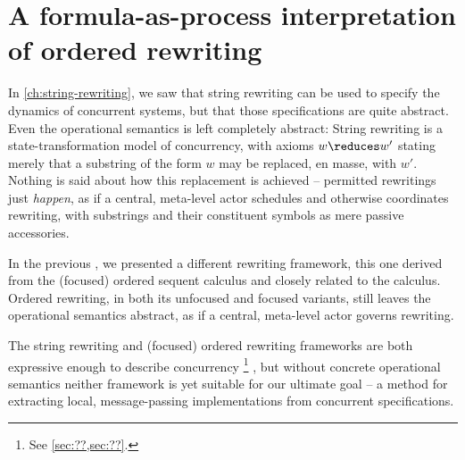 \chapter{A formula-as-process interpretation of ordered rewriting}\label{ch:formula-as-process}



In \cref{ch:string-rewriting}, we saw that string rewriting can be used to specify the dynamics of concurrent systems, but that those specifications are quite abstract.
Even the operational semantics is left completely abstract:
String rewriting is a state-transformation model of concurrency, with axioms $w \reduces w'$
stating merely that a substring of the form $w$ may be replaced, en masse, with $w'$.
Nothing is said about how this replacement is achieved -- permitted rewritings just \emph{happen}, as if a central, meta-level actor schedules and otherwise coordinates rewriting, with substrings and their constituent symbols as mere passive accessories.

In the previous , we presented a different rewriting framework, this one derived from the (focused) ordered sequent calculus and closely related to the \citeauthor{Lambek:AMM58} calculus\autocite{Lambek:AMM58}.
Ordered rewriting, in both its unfocused and focused variants, still leaves the operational semantics abstract, as if a central, meta-level actor governs rewriting.

The string rewriting and (focused) ordered rewriting frameworks are both expressive enough to describe concurrency%
\footnote{See \cref{sec:??,sec:??}.}%
, but without concrete operational semantics neither framework is yet suitable for our ultimate goal -- a method for extracting local, message-passing implementations from concurrent specifications.


